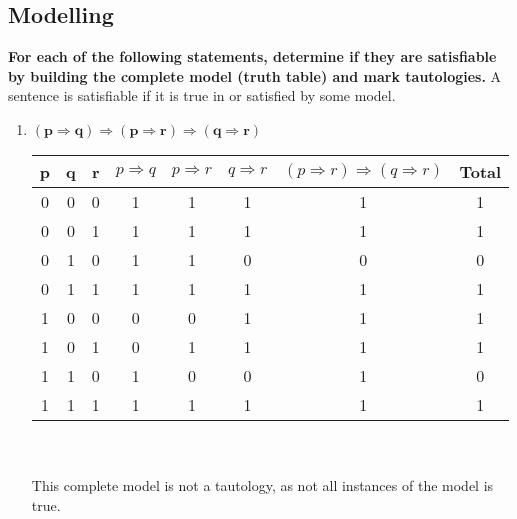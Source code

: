 \subsection{Modelling}
\begin{large}
  \textbf{For each of the following statements, determine if they are satisfiable by building the complete model (truth table) and mark tautologies.}
  A sentence is satisfiable if it is true in or satisfied by some model.

  \begin{enumerate}[label= (\alph*)]
    \item $ \mathbf{(p \Rightarrow q) \Rightarrow (p \Rightarrow r) \Rightarrow ( q \Rightarrow r )}$

          \begin{tabular}{c|c|c|c|c|c|c||c}
            p & q & r & $ p \Rightarrow q $ & $ p \Rightarrow r $ & $ q \Rightarrow r $ & $ (p \Rightarrow r) \Rightarrow ( q \Rightarrow r ) $ & Total \\
            \hline \hline
            0 & 0 & 0 & 1                   & 1                   & 1                   & 1                                                     & 1     \\
            \hline
            0 & 0 & 1 & 1                   & 1                   & 1                   & 1                                                     & 1     \\
            \hline
            0 & 1 & 0 & 1                   & 1                   & 0                   & 0                                                     & 0     \\
            \hline
            0 & 1 & 1 & 1                   & 1                   & 1                   & 1                                                     & 1     \\
            \hline
            1 & 0 & 0 & 0                   & 0                   & 1                   & 1                                                     & 1     \\
            \hline
            1 & 0 & 1 & 0                   & 1                   & 1                   & 1                                                     & 1     \\
            \hline
            1 & 1 & 0 & 1                   & 0                   & 0                   & 1                                                     & 0     \\
            \hline
            1 & 1 & 1 & 1                   & 1                   & 1                   & 1                                                     & 1     \\
            \hline
          \end{tabular}
          \\ \\
          This complete model is not a tautology, as not all instances of the model is true.


\end{enumerate}
\end{large}
